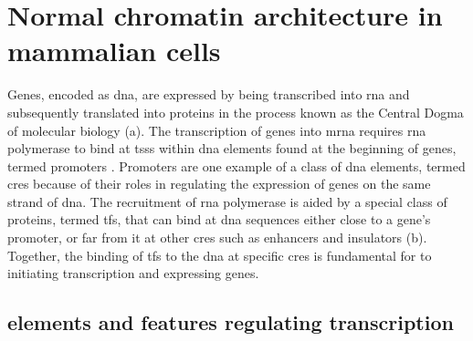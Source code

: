 \section{Normal chromatin architecture in mammalian cells}

Genes, encoded as \gls{dna}, are expressed by being transcribed into \gls{rna} and subsequently translated into proteins in the process known as the Central Dogma of molecular biology \cite{albertsMolecularBiologyCell2015} (a).
The transcription of genes into \gls{mrna} requires \gls{rna} polymerase to bind at \glspl{tss} within \gls{dna} elements found at the beginning of genes, termed promoters \cite{goodrichUnexpectedRolesCore2010}.
Promoters are one example of a class of \gls{dna} elements, termed \glspl{cre} because of their roles in regulating the expression of genes on the same strand of \gls{dna}.
The recruitment of \gls{rna} polymerase is aided by a special class of proteins, termed \glspl{tf}, that can bind at \gls{dna} sequences either close to a gene's promoter, or far from it at other \glspl{cre} such as enhancers and insulators \cite{schoenfelderLongrangeEnhancerPromoter2019,spitzTranscriptionFactorsEnhancer2012,ongEnhancerFunctionNew2011,anderssonDeterminantsEnhancerPromoter2020,gasznerInsulatorsExploitingTranscriptional2006,oudelaarRelationshipGenomeStructure2020} (b).
Together, the binding of \glspl{tf} to the \gls{dna} at specific \glspl{cre} is fundamental for to initiating transcription and expressing genes.

\subsection{ elements and features regulating transcription}

